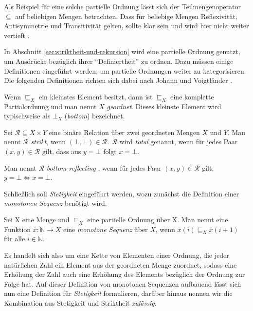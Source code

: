 Als Beispiel für eine solche partielle Ordnung lässt sich der Teilmengenoperator $\subseteq$ auf beliebigen Mengen betrachten.
Dass für beliebige Mengen Reflexivität, Antisymmetrie und Transitivität gelten, sollte klar sein und wird hier nicht weiter
vertieft .

In Abschnitt \ref{sec:striktheit-und-rekursion} wird eine partielle Ordnung genutzt, um Ausdrücke bezüglich ihrer ``Definiertheit''
zu ordnen. Dazu müssen einige Definitionen eingeführt werden, um partielle Ordnungen weiter zu kategorisieren. Die folgenden
Definitionen richten sich dabei nach Johann und Voigtländer \cite{johann2006}. 

\begin{mydef}
Wenn $\sqsubseteq_{X}$ ein kleinstes Element besitzt, dann ist $\sqsubseteq_{X}$ eine komplette Partialordnung und man nennt $X$
\textit{geordnet}. Dieses kleinste Element wird typischweise als $\bot_{X}$ (\textit{bottom}) bezeichnet.
\end{mydef}

\begin{mydef}
Sei $\mathcal{R} \subseteq X \times Y$ eine binäre Relation über zwei geordneten Mengen $X$ und $Y$. Man nennt $\mathcal{R}$ \textit{strikt},
wenn $(\bot, \bot) \in \mathcal{R}$. $\mathcal{R}$ wird \textit{total} genannt, wenn für jedes Paar $(x, y) \in \mathcal{R}$ gilt, dass
aus $y = \bot$ folgt $x = \bot$.
\end{mydef}

\begin{mydef}
Man nennt $\mathcal{R}$ \textit{bottom-reflecting} , wenn für jedes Paar
$(x, y) \in \mathcal{R}$ gilt: $y = \bot \Leftrightarrow x = \bot$.
\end{mydef}

Schließlich soll \textit{Stetigkeit} eingeführt werden, wozu zunächst die Definition einer \textit{monotonen Sequenz} benötigt wird.

\begin{mydef}
Sei X eine Menge und $\sqsubseteq_{X}$ eine partielle Ordnung über X. Man nennt eine Funktion $\bar{x} : \mathbb{N} \rightarrow X$
eine \textit{monotone Sequenz} über $X$, wenn $\bar{x}(i) \sqsubseteq_{X} \bar{x}(i + 1)$ für alle $i \in \mathbb{N}$.
\end{mydef}

Es handelt sich also um eine Kette von Elementen einer Ordnung, die jeder natürlichen Zahl ein Element aus der geordneten Menge
zuordnet, sodass eine Erhöhung der Zahl auch eine Erhöhung des Elements bezüglich der Ordnung zur Folge hat.
Auf dieser Definition von monotonen Sequenzen aufbauend lässt sich nun eine Definition für \textit{Stetigkeit} formulieren, darüber
hinaus nennen wir die Kombination aus Stetigkeit und Striktheit \textit{zulässig}.

